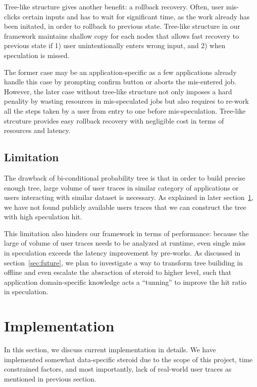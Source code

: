 Tree-like structure gives another benefit: a rollback recovery. Often, user
mis-clicks certain inputs and has to wait for significant time, as the work
already has been initated, in order to rollback to previous state. 
Tree-like structure in our framework maintains shallow copy for each nodes that
allows fast recovery to previous state if 1) user unintentionally enters wrong
input, and 2) when speculation is missed. 

The former case may be an application-specific as a few applications already
handle this case by prompting confirm button or aborts the mis-entered job.
However, the later case without tree-like structure not only imposes a hard
penality by wasting resources in mis-speculated jobs but also requires to
re-work all the steps taken by a user from entry to one before mis-speculation.
Tree-like strcuture provides easy rollback recovery with negligible cost in
terms of resources and latency.

\subsection{Limitation}
The drawback of bi-conditional probability tree is that in order to build
precise enough tree,  large volume of user traces in similar category of
applications or users interacting with similar dataset is necessary.
As explained in later section~\ref{sec:impl}, we have not found publicly
available users traces that we can construct the tree with high speculation hit.

This limitation also hinders our framework in terms of performance: because the
large of volume of user traces needs to be analyzed at runtime, even single miss
in speculation exceeds the latency improvement by pre-works. 
As discussed in section~\ref{sec:future}, we plan to investigate a way to
transform tree builiding in offline and even escalate the absraction of steroid
to higher level, such that application domain-specific knowledge acts a
``tunning'' to improve the hit ratio in speculation.

\section{Implementation}
\label{sec:impl}
In this section, we discuss current implementation in details.
We have implemented somewhat data-specific steroid due to the scope of this
project, time constrained factors, and most importantly, lack of real-world
user traces as mentioned in previous section. 

